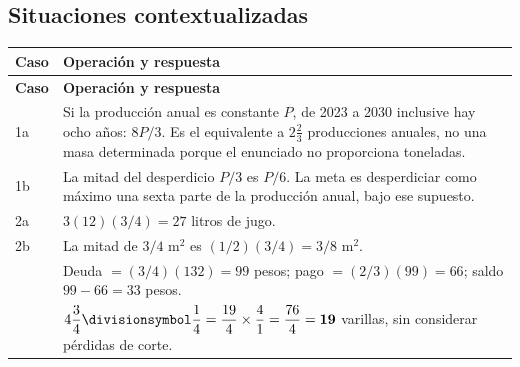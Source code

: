 \documentclass[spanish,letterpaper,oneside]{article}
\let\div\divisionsymbol
\begin{document}
\subsection*{Situaciones contextualizadas}

{\small{}\renewcommand{\arraystretch}{1.25}
\begin{longtable}{|>{\raggedright\arraybackslash}p{}|>{\raggedright\arraybackslash}p{}|}\hline
\rowcolor{iiiepePale} \textbf{Caso} & \textbf{Operación y respuesta} \\\hline
\endfirsthead
\hline
\rowcolor{iiiepePale} \textbf{Caso} & \textbf{Operación y respuesta} \\\hline
\endhead
1a & Si la producción anual es constante $P$, de 2023 a 2030 inclusive hay ocho años: $8P/3$. Es el equivalente a $2\frac23$ producciones anuales, no una masa determinada porque el enunciado no proporciona toneladas. \\\hline
1b & La mitad del desperdicio $P/3$ es $P/6$. La meta es desperdiciar como máximo una sexta parte de la producción anual, bajo ese supuesto. \\\hline
2a & $3(12)(3/4)=27$ litros de jugo. \\\hline
2b & La mitad de $3/4$ m$^2$ es $(1/2)(3/4)=3/8$ m$^2$. \\\hline
3 & Deuda $=(3/4)(132)=99$ pesos; pago $=(2/3)(99)=66$; saldo $99-66=33$ pesos. \\\hline
4 & $4\dfrac{3}{4}\div\dfrac{1}{4} = \dfrac{19}{4}\times\dfrac{4}{1} = \dfrac{76}{4} = \mathbf{19}$ varillas, sin considerar pérdidas de corte. \\\hline
\end{longtable}}
\end{document}
